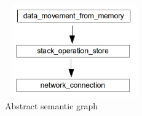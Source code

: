 \begin{figure}[!h]
\begin{center}\vspace{-1mm}
\includegraphics[height=4cm, width=6cm]{srj-figures/srj-graph.png} \vspace{-1mm}
\caption{Abstract semantic graph}
\label{fig:abs} %
\end{center}
\end{figure}
%


